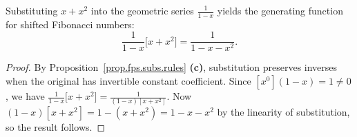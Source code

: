 \begin{lemma}
\label{lem.fps.geometric-subst-fibonacci}
\leanhelper
\leanok
Substituting $x + x^2$ into the geometric series $\frac{1}{1-x}$ yields
the generating function for shifted Fibonacci numbers:
\[
\frac{1}{1-x}\Big[x + x^2\Big] = \frac{1}{1 - x - x^2}.
\]
\end{lemma}

\begin{proof}
By Proposition~\ref{prop.fps.subs.rules} \textbf{(c)}, substitution preserves
inverses when the original has invertible constant coefficient. Since
$[x^0](1-x) = 1 \neq 0$, we have
$\frac{1}{1-x}\big[x+x^2\big] = \frac{1}{(1-x)[x+x^2]}$. Now
$(1-x)[x+x^2] = 1 - (x+x^2) = 1 - x - x^2$ by the linearity of substitution,
so the result follows.
\end{proof}
